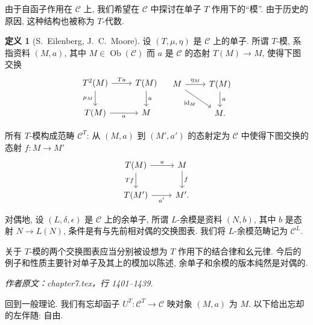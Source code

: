 \documentclass[11pt]{article}
\newcommand{\identity}{\mathrm{id}}
\newcommand{\Obj}{\operatorname{Ob}}
\renewcommand{\index}[2][]{\relax}
\newcommand{\CorpusNumber}{0}
\theoremstyle{definition}
\newtheorem{definition}[theorem]{定义}
\begin{document}
由于自函子作用在 $\mathcal{C}$ 上, 我们希望在 $\mathcal{C}$ 中探讨在单子 $T$ 作用下的``模''. 由于历史的原因, 这种结构也被称为 $T$-代数.

\def\CorpusNumber{7.6.3}
\begin{definition}[S.\ Eilenberg, J.\ C.\ Moore]\label{def:T-Alg}
	\index{mo}
	设 $(T, \mu, \eta)$ 是 $\mathcal{C}$ 上的单子. 所谓 $T$-模, 系指资料 $(M, a)$, 其中 $M \in \Obj(\mathcal{C})$ 而 $a$ 是 $\mathcal{C}$ 的态射 $T(M) \to M$, 使得下图交换
	\[\begin{tikzcd}
		T^2 (M) \arrow[r, "Ta"] \arrow[d, "\mu_M"'] & T(M) \arrow[d, "a"] \\
		T(M) \arrow[r, "a"'] & M
	\end{tikzcd} \quad \begin{tikzcd}
		M \arrow[r, "\eta_M"] \arrow[rd, "{\identity_M}"'] & T(M) \arrow[d, "a"] \\
		& M .
	\end{tikzcd}\]

	所有 $T$-模构成范畴 $\mathcal{C}^T$: 从 $(M, a)$ 到 $(M', a')$ 的态射定为 $\mathcal{C}$ 中使得下图交换的态射 $f: M \to M'$
	\[\begin{tikzcd}
		T(M) \arrow[r, "a"] \arrow[d, "Tf"'] & M \arrow[d, "f"] \\
		T(M')  \arrow[r, "{a'}"'] & M' .
	\end{tikzcd}\]

	对偶地, 设 $(L, \delta, \epsilon)$ 是 $\mathcal{C}$ 上的余单子, 所谓 $L$-余模是资料 $(N, b)$, 其中 $b$ 是态射 $N \to L(N)$, 条件是有与先前相对偶的交换图表. 我们将 $L$-余模范畴记为 $\mathcal{C}^L$.
\end{definition}

关于 $T$-模的两个交换图表应当分别被设想为 $T$ 作用下的结合律和幺元律. 今后的例子和性质主要针对单子及其上的模加以陈述, 余单子和余模的版本纯然是对偶的.
\par\medskip\noindent\textit{作者原文：chapter7.tex，行 1401--1439.}\par
回到一般理论. 我们有忘却函子 $U^T: \mathcal{C}^T \to \mathcal{C}$ 映对象 $(M, a)$ 为 $M$. 以下给出忘却的左伴随: 自由.
\end{document}
